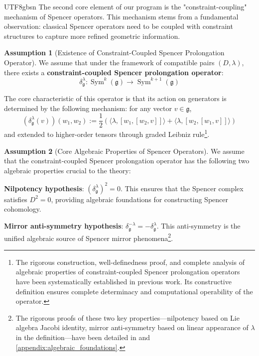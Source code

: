 \documentclass[a4paper,12pt]{extarticle}
\theoremstyle{definition}
\newtheorem{assumption}{Assumption}[theorem]
\begin{document}
\begin{CJK}{UTF8}{gbsn}
The second core element of our program is the "constraint-coupling" mechanism of Spencer operators. This mechanism stems from a fundamental observation: classical Spencer operators need to be coupled with constraint structures to capture more refined geometric information.

\begin{assumption}[Existence of Constraint-Coupled Spencer Prolongation Operator]
\label{assumption:constraint_coupled_spencer_operator}
We assume that under the framework of compatible pairs $(D,\lambda)$, there exists a \textbf{constraint-coupled Spencer prolongation operator}:
\begin{equation}
\delta^\lambda_\mathfrak{g}: \operatorname{Sym}^k(\mathfrak{g}) \to \operatorname{Sym}^{k+1}(\mathfrak{g})
\end{equation}

The core characteristic of this operator is that its action on generators is determined by the following mechanism: for any vector $v \in \mathfrak{g}$,
\begin{equation}
\label{eq:spencer_operator_rigorous_definition}
(\delta^\lambda_\mathfrak{g}(v))(w_1, w_2) := \frac{1}{2} \left( \langle \lambda, [w_1, [w_2, v]] \rangle + \langle \lambda, [w_2, [w_1, v]] \rangle \right)
\end{equation}
and extended to higher-order tensors through graded Leibniz rule\footnote{The rigorous construction, well-definedness proof, and complete analysis of algebraic properties of constraint-coupled Spencer prolongation operators have been systematically established in previous work. Its constructive definition ensures complete determinacy and computational operability of the operator.}.
\end{assumption}

\begin{assumption}[Core Algebraic Properties of Spencer Operators]
\label{assumption:spencer_algebraic_properties}
We assume that the constraint-coupled Spencer prolongation operator has the following two algebraic properties crucial to the theory:

\textbf{Nilpotency hypothesis}: $(\delta^\lambda_\mathfrak{g})^2 = 0$. This ensures that the Spencer complex satisfies $D^2 = 0$, providing algebraic foundations for constructing Spencer cohomology.

\textbf{Mirror anti-symmetry hypothesis}: $\delta^{-\lambda}_\mathfrak{g} = -\delta^\lambda_\mathfrak{g}$. This anti-symmetry is the unified algebraic source of Spencer mirror phenomena\footnote{The rigorous proofs of these two key properties—nilpotency based on Lie algebra Jacobi identity, mirror anti-symmetry based on linear appearance of $\lambda$ in the definition—have been detailed in\cite{zheng2025mirror} and \ref{appendix:algebraic_foundations}.}.
\end{assumption}


\end{CJK}
\end{document}
